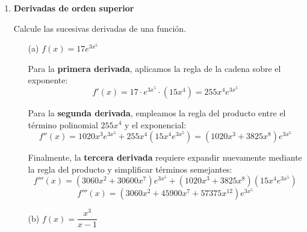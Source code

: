 \documentclass[12pt]{article}
\begin{document}
{\begin{enumerate}
\begin{itemize}
    \item[(e)] $f(x) = \ln(\sin^3(x))$
    
    Para esta función compuesta, aplicamos la regla de la cadena. Definimos la función interna como $u = \sin^3(x)$, cuya derivada es $u' = 3\sin^2(x)\cos(x)$. Sabiendo que $\frac{d}{dx}\ln(u) = \frac{u'}{u}$, resulta:
    \[
    f'(x) = \frac{3\sin^2(x)\cos(x)}{\sin^3(x)}
    \]
    Simplificando los términos trigonométricos, obtenemos una expresión elegante basada en la función cotangente:
    \[
    f'(x) = \frac{3\cos(x)}{\sin(x)} = 3\cot(x)
    \]

    \item[(f)] $f(x) = \sec(x)$
    
    Considerando la identidad $\sec(x) = (\cos(x))^{-1}$, aplicamos la regla del cociente (o alternativamente la regla de la cadena para potencias negativas):
    \[
    f'(x) = \frac{d}{dx}\left(\frac{1}{\cos(x)}\right) = \frac{0 \cdot \cos(x) - 1 \cdot (-\sin(x))}{\cos^2(x)} = \frac{\sin(x)}{\cos^2(x)}
    \]
    Mediante la descomposición en fracciones, la derivada se identifica comúnmente como:
    \[
    f'(x) = \frac{\sin(x)}{\cos(x)} \cdot \frac{1}{\cos(x)} = \tan(x)\sec(x)
    \]
\end{itemize}


\item \textbf{Derivadas de orden superior}

Calcule las sucesivas derivadas de una función.

\begin{itemize}
    \item[(a)] $f(x)=17e^{3x^5}$
    
    Para la \textbf{primera derivada}, aplicamos la regla de la cadena sobre el exponente:
    \[ f'(x) = 17 \cdot e^{3x^5} \cdot (15x^4) = 255x^4 e^{3x^5} \]
    
    Para la \textbf{segunda derivada}, empleamos la regla del producto entre el término polinomial $255x^4$ y el exponencial:
    \[ f''(x) = 1020x^3 e^{3x^5} + 255x^4 (15x^4 e^{3x^5}) = (1020x^3 + 3825x^8) e^{3x^5} \]
    
    Finalmente, la \textbf{tercera derivada} requiere expandir nuevamente mediante la regla del producto y simplificar términos semejantes:
    \[ f'''(x) = (3060x^2 + 30600x^7)e^{3x^5} + (1020x^3 + 3825x^8)(15x^4 e^{3x^5}) \]
    \[ f'''(x) = (3060x^2 + 45900x^7 + 57375x^{12})e^{3x^5} \]

    \item[(b)] $f(x)=\dfrac{x^3}{x-1}$
    

\end{itemize}
\end{enumerate}}
\end{document}
